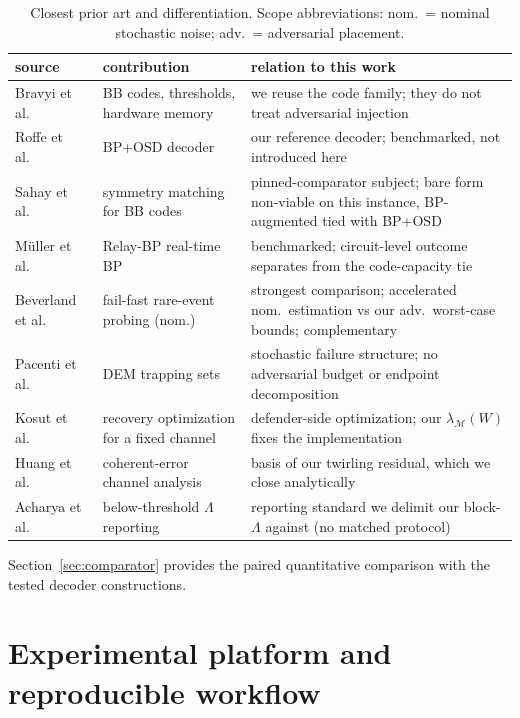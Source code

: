 \documentclass[pdflatex,sn-mathphys-num]{sn-jnl}
\theoremstyle{thmstyleone}
\theoremstyle{thmstyletwo}
\theoremstyle{thmstylethree}
\begin{document}
\begin{table}[htbp]\centering\small
\caption{Closest prior art and differentiation. Scope abbreviations: nom.\ = nominal stochastic noise; adv.\ = adversarial placement.}
\label{tab:priorart}
\begin{tabular}{@{}p{}p{}p{}@{}}
\toprule
source & contribution & relation to this work \\\midrule
Bravyi et al.\ \cite{Bravyi2024} & BB codes, thresholds, hardware memory & we reuse the code family; they do not treat adversarial injection \\
Roffe et al.\ \cite{Roffe2020} & BP+OSD decoder & our reference decoder; benchmarked, not introduced here \\
Sahay et al.\ \cite{SahayBrown2026} & symmetry matching for BB codes & pinned-comparator subject; bare form non-viable on this instance, BP-augmented tied with BP+OSD \\
M\"uller et al.\ \cite{Muller2025relay} & Relay-BP real-time BP & benchmarked; circuit-level outcome separates from the code-capacity tie \\
Beverland et al.\ \cite{beverland2025failfast} & fail-fast rare-event probing (nom.) & strongest comparison; accelerated nom.\ estimation vs our adv.\ worst-case bounds; complementary \\
Pacenti et al.\ \cite{Pacenti2026trapping} & DEM trapping sets & stochastic failure structure; no adversarial budget or endpoint decomposition \\
Kosut et al.\ \cite{kosut2008robust} & recovery optimization for a fixed channel & defender-side optimization; our $\lambda_{\mathcal{M}}(W)$ fixes the implementation \\
Huang et al.\ \cite{huang2019coherent} & coherent-error channel analysis & basis of our twirling residual, which we close analytically \\
Acharya et al.\ \cite{Acharya2024lambda} & below-threshold $\Lambda$ reporting & reporting standard we delimit our block-$\Lambda$ against (no matched protocol) \\
\bottomrule
\end{tabular}
\end{table}
Section~\ref{sec:comparator} provides the paired quantitative comparison with the tested decoder constructions.

\section{Experimental platform and reproducible workflow}
\label{sec:emulator}
\end{document}
